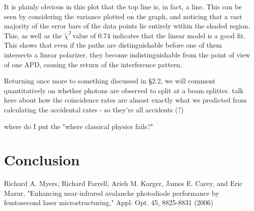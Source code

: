 \documentclass{article}
\newcommand{\redchi}{$\tilde{\chi}^2\,$}
\begin{document}
It is plainly obvious in this plot that the top line is, in fact, a line.  This can be seen by considering the variance plotted on the graph, and noticing that a vast majority of the error bars of the data points lie entirely within the shaded region.  This, as well as the \redchi value of 0.74 indicates that the linear model is a good fit.  This shows that even if the paths are distinguishable before one of them intersects a linear polarizer, they become indistinguishable from the point of view of one APD, causing the return of the interference pattern.

\hspace{.5cm}

Returning once more to something discussed in \S 2.2, we will comment quantitatively on whether photons are observed to split at a beam splitter.  talk here about how the coincidence rates are almost exactly what we predicted from calculating the accidental rates - so they're all accidents (?)

where do I put the "where classical physics fails?"

\section{Conclusion}

\begin{thebibliography}{10}
		Richard A. Myers, Richard Farrell, Arieh M. Karger, James E. Carey, and Eric Mazur, "Enhancing near-infrared avalanche photodiode performance by femtosecond laser microstructuring," Appl. Opt. 45, 8825-8831 (2006)

\end{thebibliography}
\end{document}
